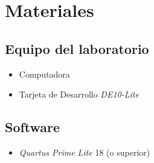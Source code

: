 \documentclass[../main.tex]{subfiles}
\begin{document}
\section{Materiales}
\subsection*{Equipo del laboratorio}
\begin{itemize}
  \item Computadora
  \item Tarjeta de Desarrollo \textit{DE10-Lite}
\end{itemize}
\subsection*{Software}
\begin{itemize}
  \item \textit{Quartus Prime Lite} 18 (o superior)
\end{itemize}
\end{document}
